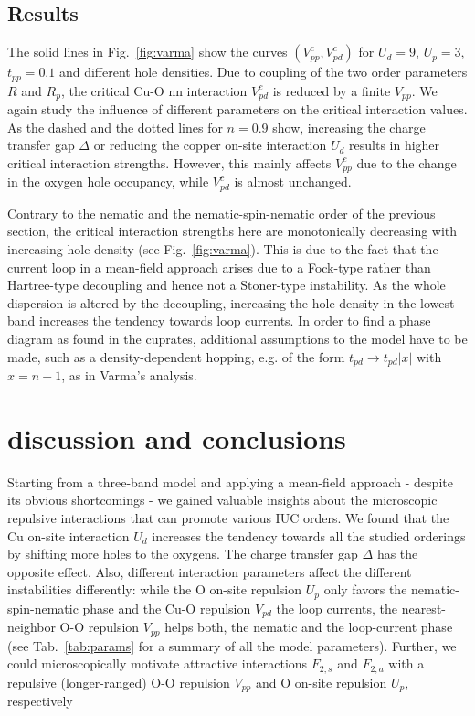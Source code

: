 \documentclass[prb, twocolumn,showpacs,preprintnumbers,amsmath,amssymb, floatfix]{revtex4}
\begin{document}
\subsection{Results}
The solid lines in Fig.~\ref{fig:varma} show the curves $(V_{pp}^c, V_{pd}^c)$ for $U_d= 9$, $U_p = 3$, $t_{pp} = 0.1$ and different hole densities. Due to coupling of the two order parameters $R$ and $R_p$, the critical Cu-O nn interaction $V_{pd}^c$ is reduced by a finite $V_{pp}$. We again study the influence of different parameters on the critical interaction values. As the dashed and the dotted lines for $n=0.9$ show, increasing the charge transfer gap $\Delta$ or reducing the copper on-site interaction $U_d$ results in higher critical interaction strengths. However, this mainly affects $V_{pp}^c$ due to the change in the oxygen hole occupancy, while $V_{pd}^{c}$ is almost unchanged. 

Contrary to the nematic and the nematic-spin-nematic order of the
previous section, the critical interaction strengths here are
monotonically decreasing with increasing hole density (see
Fig.~\ref{fig:varma}). This is due to the fact that the current
loop in a mean-field approach arises due to a Fock-type 
rather than Hartree-type decoupling and hence not 
a Stoner-type instability.
As the whole dispersion is altered by the decoupling, increasing the hole density in the lowest band increases the tendency towards loop currents. In order to find a phase diagram as found in the cuprates, additional assumptions to the model have to be made, such as a density-dependent hopping, e.g. of the form $t_{pd}\rightarrow t_{pd}|x|$ with $x = n-1$, as in Varma's analysis.~\cite{varma:2006b}

\section{discussion and conclusions}
\label{sec:discussion}
Starting from a three-band model and applying a mean-field approach - despite its obvious shortcomings - we gained valuable insights about the microscopic repulsive interactions that can promote various IUC orders.
We found that the Cu on-site interaction $U_{d}$ increases the tendency towards all the studied orderings by shifting more holes to the oxygens. The charge transfer gap $\Delta$ has the opposite effect.
Also, different interaction parameters affect the different instabilities differently: while the O on-site repulsion $U_{p}$ only favors the nematic-spin-nematic phase and the Cu-O repulsion $V_{pd}$ the loop currents, the nearest-neighbor O-O repulsion $V_{pp}$ helps both, the nematic and the loop-current phase (see Tab.~\ref{tab:params} for a summary of all the model parameters). 
Further, we could microscopically motivate attractive interactions $F_{2,s}$ and $F_{2,a}$ with a repulsive (longer-ranged) O-O repulsion $V_{pp}$ and O on-site repulsion $U_p$, respectively 
\end{document}
